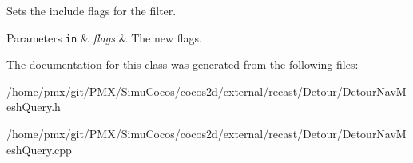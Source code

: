 Sets the include flags for the filter. 
\begin{DoxyParams}[1]{Parameters}
\mbox{\tt in}  & {\em flags} & The new flags. \\
\hline
\end{DoxyParams}


The documentation for this class was generated from the following files\+:\begin{DoxyCompactItemize}
\item 
/home/pmx/git/\+P\+M\+X/\+Simu\+Cocos/cocos2d/external/recast/\+Detour/Detour\+Nav\+Mesh\+Query.\+h\item 
/home/pmx/git/\+P\+M\+X/\+Simu\+Cocos/cocos2d/external/recast/\+Detour/Detour\+Nav\+Mesh\+Query.\+cpp\end{DoxyCompactItemize}
